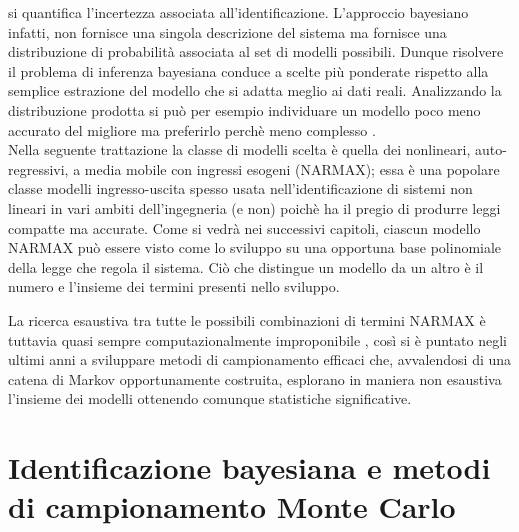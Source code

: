\documentclass[10pt,a4paper,oneside,openany]{book}
\begin{document}
si quantifica l’incertezza associata all’identificazione. L’approccio bayesiano infatti, non fornisce una singola descrizione del sistema ma fornisce una distribuzione di
probabilità associata al set di modelli possibili. Dunque risolvere il problema di
inferenza bayesiana conduce a scelte più  ponderate rispetto alla semplice estrazione
del modello che si adatta meglio ai dati reali. Analizzando la distribuzione prodotta
si può per esempio individuare un modello poco meno accurato del migliore ma
preferirlo perchè meno complesso .\\
Nella seguente trattazione la classe di modelli scelta è quella dei nonlineari, auto-regressivi, a media mobile
con ingressi esogeni (NARMAX); essa è una popolare classe modelli ingresso-uscita
spesso usata nell’identificazione di sistemi non lineari in vari ambiti dell’ingegneria
(e non) poichè ha il pregio di produrre leggi compatte ma accurate.
Come si vedrà nei successivi capitoli, ciascun modello NARMAX può essere visto
come lo sviluppo su una opportuna base polinomiale della legge che
regola il sistema. Ciò che distingue un modello da un altro è il numero e l’insieme
dei termini presenti nello sviluppo.

La ricerca esaustiva tra tutte le possibili combinazioni di termini NARMAX è tuttavia quasi sempre computazionalmente improponibile , così si è puntato negli ultimi
anni a sviluppare metodi di campionamento efficaci che, avvalendosi di una catena
di Markov opportunamente costruita, esplorano in maniera non esaustiva l’insieme
dei modelli ottenendo comunque statistiche significative.
\chapter{Identificazione bayesiana e metodi
di campionamento Monte Carlo}
\end{document}
